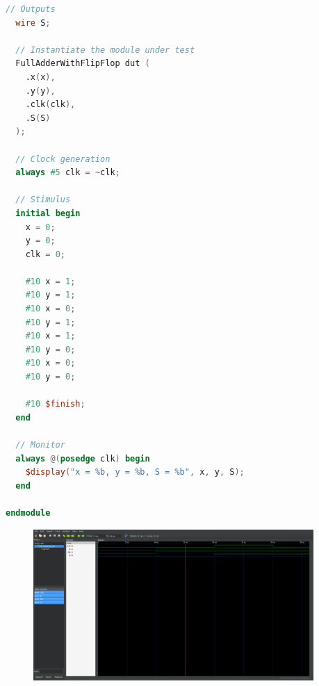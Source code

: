 \documentclass{zc-ust-hw}
\begin{document}
\begin{enumerate}
\begin{lstlisting}[language=Verilog]
  // Outputs
  wire S;

  // Instantiate the module under test
  FullAdderWithFlipFlop dut (
    .x(x),
    .y(y),
    .clk(clk),
    .S(S)
  );

  // Clock generation
  always #5 clk = ~clk;

  // Stimulus
  initial begin
    x = 0;
    y = 0;
    clk = 0;

    #10 x = 1;
    #10 y = 1;
    #10 x = 0;
    #10 y = 1;
    #10 x = 1;
    #10 y = 0;
    #10 x = 0;
    #10 y = 0;

    #10 $finish;
  end

  // Monitor
  always @(posedge clk) begin
    $display("x = %b, y = %b, S = %b", x, y, S);
  end

endmodule
    \end{lstlisting}

    \begin{figure}[H]
      \begin{center}
        \includegraphics[width=0.95\textwidth]{figures/WhatsApp Image 2023-12-15 at 12.02.26 AM.jpeg}
      \end{center}
      \caption{}
    \end{figure}
    

\end{enumerate}
\end{document}
